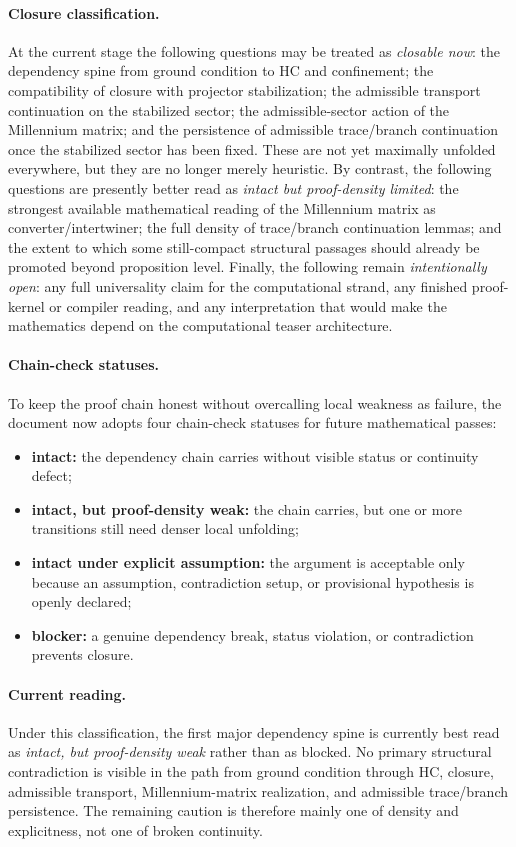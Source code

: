 \documentclass[12pt,a4paper]{article}
\begin{document}
\paragraph{Closure classification.}
At the current stage the following questions may be treated as \emph{closable now}: the dependency spine from ground condition to HC and confinement; the compatibility of closure with projector stabilization; the admissible transport continuation on the stabilized sector; the admissible-sector action of the Millennium matrix; and the persistence of admissible trace/branch continuation once the stabilized sector has been fixed. These are not yet maximally unfolded everywhere, but they are no longer merely heuristic. By contrast, the following questions are presently better read as \emph{intact but proof-density limited}: the strongest available mathematical reading of the Millennium matrix as converter/intertwiner; the full density of trace/branch continuation lemmas; and the extent to which some still-compact structural passages should already be promoted beyond proposition level. Finally, the following remain \emph{intentionally open}: any full universality claim for the computational strand, any finished proof-kernel or compiler reading, and any interpretation that would make the mathematics depend on the computational teaser architecture.

\paragraph{Chain-check statuses.}
To keep the proof chain honest without overcalling local weakness as failure, the document now adopts four chain-check statuses for future mathematical passes:
\begin{itemize}[leftmargin=2em]
 \item \textbf{intact:} the dependency chain carries without visible status or continuity defect;
 \item \textbf{intact, but proof-density weak:} the chain carries, but one or more transitions still need denser local unfolding;
 \item \textbf{intact under explicit assumption:} the argument is acceptable only because an assumption, contradiction setup, or provisional hypothesis is openly declared;
 \item \textbf{blocker:} a genuine dependency break, status violation, or contradiction prevents closure.
\end{itemize}

\paragraph{Current reading.}
Under this classification, the first major dependency spine is currently best read as \emph{intact, but proof-density weak} rather than as blocked. No primary structural contradiction is visible in the path from ground condition through HC, closure, admissible transport, Millennium-matrix realization, and admissible trace/branch persistence. The remaining caution is therefore mainly one of density and explicitness, not one of broken continuity.
\end{document}
